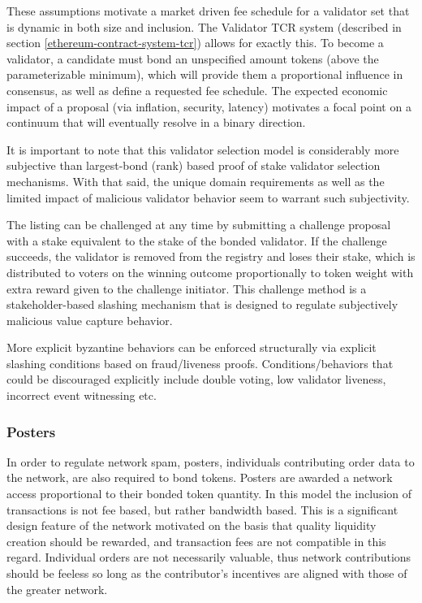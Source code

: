 \documentclass[10pt]{article}
\begin{document}
These assumptions motivate a market driven fee schedule for a validator set that is dynamic in both size and inclusion. The Validator TCR system (described in section \ref{ethereum-contract-system-tcr}) allows for exactly this. To become a validator, a candidate must bond an unspecified amount tokens (above the parameterizable minimum), which will provide them a proportional influence in consensus, as well as define a requested fee schedule. The expected economic impact of a proposal (via inflation, security, latency) motivates a focal point on a continuum that will eventually resolve in a binary direction.
\medskip

It is important to note that this validator selection model is considerably more subjective than largest-bond (rank) based proof of stake validator selection mechanisms. With that said, the unique domain requirements as well as the limited impact of malicious validator behavior seem to warrant such subjectivity.
\medskip

The listing can be challenged at any time by submitting a challenge proposal with a stake equivalent to the stake of the bonded validator. If the challenge succeeds, the validator is removed from the registry and loses their stake, which is distributed to voters on the winning outcome proportionally to token weight with extra reward given to the challenge initiator. This challenge method is a stakeholder-based slashing mechanism that is designed to regulate subjectively malicious value capture behavior.
\medskip

More explicit byzantine behaviors can be enforced structurally via explicit slashing conditions based on fraud/liveness proofs. Conditions/behaviors that could be discouraged explicitly include double voting, low validator liveness, incorrect event witnessing etc.

\subsubsection{Posters}\label{incentive-models-posters}
In order to regulate network spam, posters, individuals contributing order data to the network, are also required to bond tokens. Posters are awarded a network access proportional to their bonded token quantity. In this model the inclusion of transactions is not fee based, but rather bandwidth based. This is a significant design feature of the network motivated on the basis that quality liquidity creation should be rewarded, and transaction fees are not compatible in this regard. Individual orders are not necessarily valuable, thus network contributions should be feeless so long as the contributor’s incentives are aligned with those of the greater network.
\medskip
\end{document}
